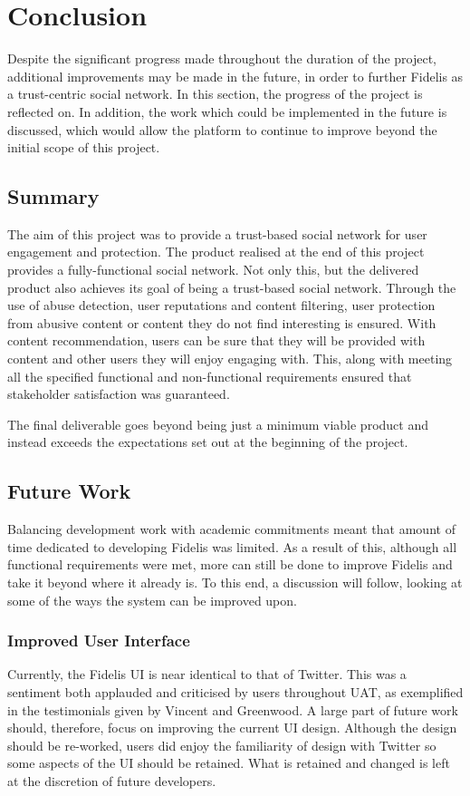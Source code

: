 \chapter{Conclusion}
\label{Chapter:Conclusion}
Despite the significant progress made throughout the duration of the project, additional improvements may be made in the future, in order to further Fidelis as a trust-centric social network. In this section, the progress of the project is reflected on. In addition, the work which could be implemented in the future is discussed, which would allow the platform to continue to improve beyond the initial scope of this project.

\section{Summary}
The aim of this project was to provide a trust-based social network for user engagement and protection. The product realised at the end of this project provides a fully-functional social network. Not only this, but the delivered product also achieves its goal of being a trust-based social network. Through the use of abuse detection, user reputations and content filtering, user protection from abusive content or content they do not find interesting is ensured. With content recommendation, users can be sure that they will be provided with content and other users they will enjoy engaging with. This, along with meeting all the specified functional and non-functional requirements ensured that stakeholder satisfaction was guaranteed. 

The final deliverable goes beyond being just a minimum viable product and instead exceeds the expectations set out at the beginning of the project.

\section{Future Work}
Balancing development work with academic commitments meant that amount of time dedicated to developing Fidelis was limited. As a result of this, although all functional requirements were met, more can still be done to improve Fidelis and take it beyond where it already is. To this end, a discussion will follow, looking at some of the ways the system can be improved upon.

\subsection{Improved User Interface}
Currently, the Fidelis UI is near identical to that of Twitter. This was a sentiment both applauded and criticised by users throughout UAT, as exemplified in the testimonials given by Vincent and Greenwood. A large part of future work should, therefore, focus on improving the current UI design. Although the design should be re-worked, users did enjoy the familiarity of design with Twitter so some aspects of the UI should be retained. What is retained and changed is left at the discretion of future developers.


